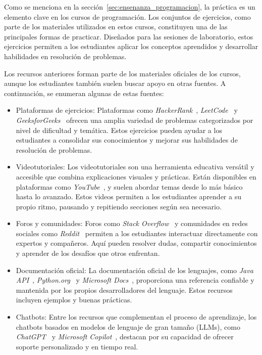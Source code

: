 Como se menciona en la sección~\ref{sec:ensenanza_programacion}, la práctica es un elemento clave en los cursos de programación. Los conjuntos de ejercicios, como parte de los materiales utilizados en estos cursos, constituyen una de las principales formas de practicar. Diseñados para las sesiones de laboratorio, estos ejercicios permiten a los estudiantes aplicar los conceptos aprendidos y desarrollar habilidades en resolución de problemas.

Los recursos anteriores forman parte de los materiales oficiales de los cursos, aunque los estudiantes también suelen buscar apoyo en otras fuentes. A continuación, se enumeran algunas de estas fuentes:

\begin{itemize}
    \item Plataformas de ejercicios: 
    Plataformas como \textit{HackerRank}~\cite{hackerrank}, \textit{LeetCode}~\cite{leetcode}  y \textit{GeeksforGeeks}~\cite{geeksforgeeks} ofrecen una amplia variedad de problemas categorizados por nivel de dificultad y temática. Estos ejercicios pueden ayudar a los estudiantes a consolidar sus conocimientos y mejorar sus habilidades de resolución de problemas.

    \item Videotutoriales:
    Los videotutoriales son una herramienta educativa versátil y accesible que combina explicaciones visuales y prácticas. Están disponibles en plataformas como \textit{YouTube}~\cite{youtube}, y suelen abordar temas desde lo más básico hasta lo avanzado. Estos videos permiten a los estudiantes aprender a su propio ritmo, pausando y repitiendo secciones según sea necesario.

    \item Foros y comunidades: 
    Foros como \textit{Stack Overflow}~\cite{stackoverflow} y comunidades en redes sociales como \textit{Reddit}~\cite{reddit} permiten a los estudiantes interactuar directamente con expertos y compañeros. Aquí pueden resolver dudas, compartir conocimientos y aprender de los desafíos que otros enfrentan.
    
    \item Documentación oficial:
    La documentación oficial de los lenguajes, como  \textit{Java API}~\cite{java-api}, \textit{Python.org}~\cite{python} y \textit{Microsoft Docs}~\cite{microsoft-docs}, proporciona una referencia confiable y mantenida por los propios desarrolladores del lenguaje. Estos recursos incluyen ejemplos y buenas prácticas.
    
    \item Chatbots: 
    Entre los recursos que complementan el proceso de aprendizaje, los chatbots basados en modelos de lenguaje de gran tamaño (LLMs), como \textit{ChatGPT}~\cite{chatgpt} y \textit{Microsoft Copilot}~\cite{copilot}, destacan por su capacidad de ofrecer soporte personalizado y en tiempo real.
\end{itemize}

